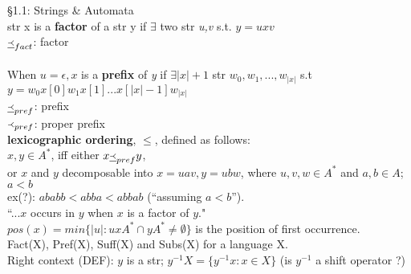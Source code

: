 \documentclass[12pt]{article}
\date{} %
\begin{document}
\S{1.1: Strings \& Automata}\\
str x is a \textbf{factor} of a str y if $\exists$ two str \textit{u,v} s.t. $y= uxv$\\
$\underline{\Yleft}_{fact}$: factor\\
\\
When $u = \epsilon, x$ is a \textbf{prefix} of \textit{y} if $\exists |x| + 1$ str $w_{0}, w_{1}, ..., w_{|x|}$ s.t\\ 
$y=w_{0}x[0] w_{1}x[1]...x[|x|-1]w_{|x|}$\\
$\underline{\Yleft}_{pref}$: prefix\\
$\Yleft_{pref}$: proper prefix\\
\textbf{lexicographic ordering}, $\le$, defined as follows:\\ 
$x,y \in A^{*}$, iff either $x \underline{\Yleft}_{pref} y$,\\
or $x$ and $y$ decomposable into $x = uav, y = ubw$, where $u, v, w \in A^{*}$ and $a,b \in A$; $a < b$\\
ex(?): $ababb < abba < abbab$ (``assuming $a < b$'').\\ 
``...$x$ occurs in $y$ when $x$ is a factor of $y$."\\
$pos(x) = min\{  |u| : uxA^{*} \cap yA^{*} \ne \emptyset \}$ is the position of first occurrence.\\
Fact(X), Pref(X), Suff(X) and Subs(X) for a language X.\\
Right context (DEF): $y$ is a str; $y^{-1}X = \{ y^{-1}x : x \in X \}$ (is $y^{-1}$ a shift operator ?)\\
\end{document}
